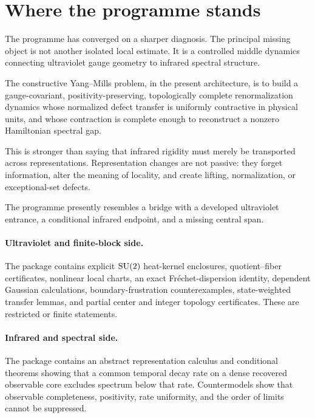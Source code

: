 \section{Where the programme stands}

The programme has converged on a sharper diagnosis.  The principal missing
object is not another isolated local estimate.  It is a controlled middle
dynamics connecting ultraviolet gauge geometry to infrared spectral
structure.

\begin{principle}
The constructive Yang--Mills problem, in the present architecture, is to build
a gauge-covariant, positivity-preserving, topologically complete
renormalization dynamics whose normalized defect transfer is uniformly
contractive in physical units, and whose contraction is complete enough to
reconstruct a nonzero Hamiltonian spectral gap.
\end{principle}

This is stronger than saying that infrared rigidity must merely be
transported across representations.  Representation changes are not passive:
they forget information, alter the meaning of locality, and create lifting,
normalization, or exceptional-set defects.

The programme presently resembles a bridge with a developed ultraviolet
entrance, a conditional infrared endpoint, and a missing central span.

\paragraph{Ultraviolet and finite-block side.}
The package contains explicit \(\mathrm{SU}(2)\) heat-kernel enclosures, quotient--fiber
certificates, nonlinear local charts, an exact Fr\'echet-dispersion identity,
dependent Gaussian calculations, boundary-frustration counterexamples,
state-weighted transfer lemmas, and partial center and integer topology
certificates.  These are restricted or finite statements.

\paragraph{Infrared and spectral side.}
The package contains an abstract representation calculus and conditional
theorems showing that a common temporal decay rate on a dense recovered
observable core excludes spectrum below that rate.  Countermodels show that
observable completeness, positivity, rate uniformity, and the order of
limits cannot be suppressed.

